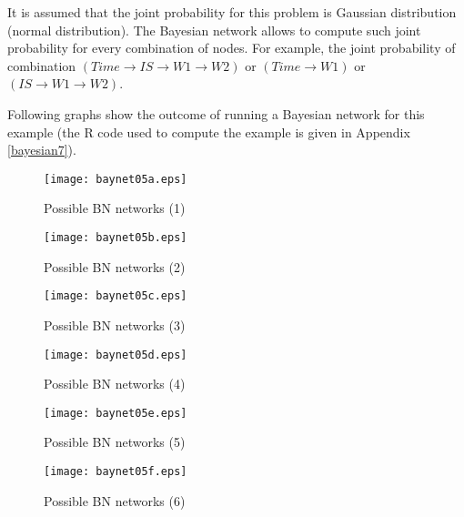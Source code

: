 It is assumed that the joint probability for this problem is Gaussian distribution
(normal distribution). The Bayesian network allows to compute such joint probability for
every combination of nodes. For example, the joint probability of combination
$(Time\to IS \to W1 \to W2)$ or $(Time \to W1)$ or $(IS \to W1 \to W2)$.

Following graphs show the outcome of running a Bayesian network for this example (the R code
used to compute the example is given in Appendix \ref{bayesian7}).

\begin{figure}[h]
\begin{center}
\texttt{[image: baynet05a.eps]}
\caption{Possible BN networks (1)}\label{baynet05a}
\end{center}
\end{figure}

\begin{figure}[h]
\begin{center}
\texttt{[image: baynet05b.eps]}
\caption{Possible BN networks (2)}\label{baynet05b}
\end{center}
\end{figure}

\begin{figure}[h]
\begin{center}
\texttt{[image: baynet05c.eps]}
\caption{Possible BN networks (3)}\label{baynet05c}
\end{center}
\end{figure}

\begin{figure}[h]
\begin{center}
\texttt{[image: baynet05d.eps]}
\caption{Possible BN networks (4)}\label{baynet05d}
\end{center}
\end{figure}

\begin{figure}[h]
\begin{center}
\texttt{[image: baynet05e.eps]}
\caption{Possible BN networks (5)}\label{baynet05e}
\end{center}
\end{figure}

\begin{figure}[h]
\begin{center}
\texttt{[image: baynet05f.eps]}
\caption{Possible BN networks (6)}\label{baynet05f}
\end{center}
\end{figure}

